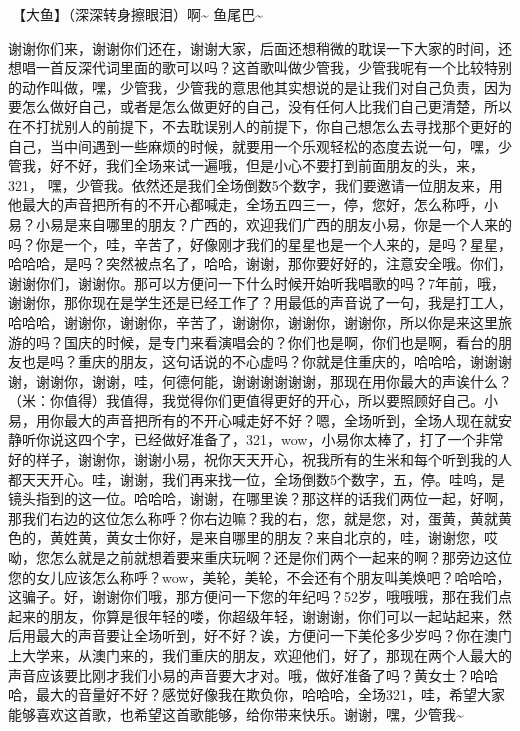 \documentclass[
]{book}
\begin{document}
🎵【大鱼】（深深转身擦眼泪）啊\textasciitilde{} 鱼尾巴\textasciitilde{}

谢谢你们来，谢谢你们还在，谢谢大家，后面还想稍微的耽误一下大家的时间，还想唱一首反深代词里面的歌可以吗？这首歌叫做少管我，少管我呢有一个比较特别的动作叫做，嘿，少管我，少管我的意思他其实想说的是让我们对自己负责，因为要怎么做好自己，或者是怎么做更好的自己，没有任何人比我们自己更清楚，所以在不打扰别人的前提下，不去耽误别人的前提下，你自己想怎么去寻找那个更好的自己，当中间遇到一些麻烦的时候，就要用一个乐观轻松的态度去说一句，嘿，少管我，好不好，我们全场来试一遍哦，但是小心不要打到前面朋友的头，来， 321， 嘿，少管我。依然还是我们全场倒数5个数字，我们要邀请一位朋友来，用他最大的声音把所有的不开心都喊走，全场五四三一，停，您好，怎么称呼，小易？小易是来自哪里的朋友？广西的，欢迎我们广西的朋友小易，你是一个人来的吗？你是一个，哇，辛苦了，好像刚才我们的星星也是一个人来的，是吗？星星，哈哈哈，是吗？突然被点名了，哈哈，谢谢，那你要好好的，注意安全哦。你们，谢谢你们，谢谢你。那可以方便问一下什么时候开始听我唱歌的吗？7年前，哦，谢谢你，那你现在是学生还是已经工作了？用最低的声音说了一句，我是打工人，哈哈哈，谢谢你，谢谢你，辛苦了，谢谢你，谢谢你，谢谢你，所以你是来这里旅游的吗？国庆的时候，是专门来看演唱会的？你们也是啊，你们也是啊，看台的朋友也是吗？重庆的朋友，这句话说的不心虚吗？你就是住重庆的，哈哈哈，谢谢谢谢，谢谢你，谢谢，哇，何德何能，谢谢谢谢谢谢，那现在用你最大的声诶什么？（米：你值得）我值得，我觉得你们更值得更好的开心，所以要照顾好自己。小易，用你最大的声音把所有的不开心喊走好不好？嗯，全场听到，全场人现在就安静听你说这四个字，已经做好准备了，321，wow，小易你太棒了，打了一个非常好的样子，谢谢你，谢谢小易，祝你天天开心，祝我所有的生米和每个听到我的人都天天开心。哇，谢谢，我们再来找一位，全场倒数5个数字，五，停。哇呜，是镜头指到的这一位。哈哈哈，谢谢，在哪里诶？那这样的话我们两位一起，好啊，那我们右边的这位怎么称呼？你右边嘛？我的右，您，就是您，对，蛋黄，黄就黄色的，黄姓黄，黄女士你好，是来自哪里的朋友？来自北京的，哇，谢谢您，哎呦，您怎么就是之前就想着要来重庆玩啊？还是你们两个一起来的啊？那旁边这位您的女儿应该怎么称呼？wow，美轮，美轮，不会还有个朋友叫美焕吧？哈哈哈，这骗子。好，谢谢你们哦，那方便问一下您的年纪吗？52岁，哦哦哦，那在我们点起来的朋友，你算是很年轻的喽，你超级年轻，谢谢谢，你们可以一起站起来，然后用最大的声音要让全场听到，好不好？诶，方便问一下美伦多少岁吗？你在澳门上大学来，从澳门来的，我们重庆的朋友，欢迎他们，好了，那现在两个人最大的声音应该要比刚才我们小易的声音要大才对。哦，做好准备了吗？黄女士？哈哈哈，最大的音量好不好？感觉好像我在欺负你，哈哈哈，全场321，哇，希望大家能够喜欢这首歌，也希望这首歌能够，给你带来快乐。谢谢，嘿，少管我\textasciitilde{}
\end{document}
